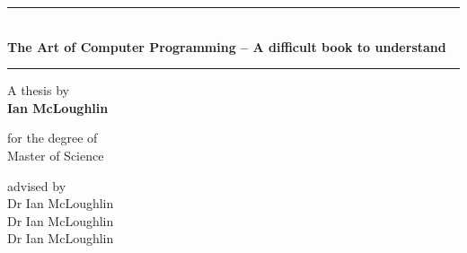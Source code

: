 
\newcommand{\thesistitle}{The Art of Computer Programming -- A difficult book to understand}
\newcommand{\thesisauthor}{Ian McLoughlin}
\newcommand{\thesisadvisor}{Dr Ian McLoughlin \\ Dr Ian McLoughlin \\ Dr Ian McLoughlin}
\newcommand{\thesisdegree}{Master of Science}
\newcommand{\thesisdate}{\today}
\newcommand{\thesisinstitute}{Galway-Mayo Institute of Technology}
\newcommand{\thesisdepartment}{Department of Computer Science and Applied Physics}


\begin{titlingpage}
  
  \begin{center}
    \begin{minipage}{\textwidth}
      \centering
      \rule{\linewidth}{0.2mm} \\[6mm]
      { \LARGE \bfseries \thesistitle } \\[2mm]
      \rule{\linewidth}{0.2mm}
    \end{minipage}
  \end{center}

  \vspace{16mm}

  \begin{center}
    \begin{minipage}[t]{\textwidth}
      \centering
      {\small A thesis by} \\
      {\large \textbf{\thesisauthor}}
    \end{minipage}
  \end{center}

  \vspace{20mm}

  \begin{center}
    \begin{minipage}[t]{\textwidth}
      \centering
      {\small for the degree of} \\
      {\large \thesisdegree}
    \end{minipage}
  \end{center}
  
  \vspace{2mm}
  
  \begin{center}
    \begin{minipage}[t]{\textwidth}
      \centering
      {\small advised by} \\
      \thesisadvisor
    \end{minipage}
  \end{center}


\end{titlingpage}
